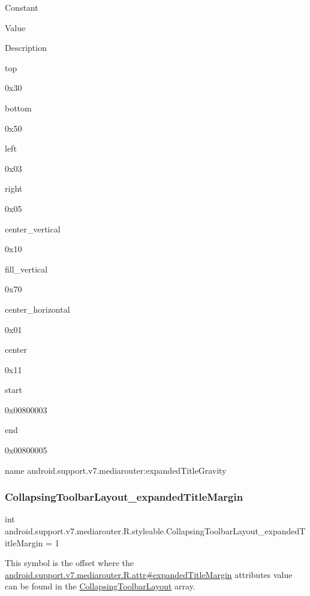 Constant

Value

Description 

{\ttfamily top}

0x30

{\ttfamily bottom}

0x50

{\ttfamily left}

0x03

{\ttfamily right}

0x05

{\ttfamily center\+\_\+vertical}

0x10

{\ttfamily fill\+\_\+vertical}

0x70

{\ttfamily center\+\_\+horizontal}

0x01

{\ttfamily center}

0x11

{\ttfamily start}

0x00800003

{\ttfamily end}

0x00800005

name android.\+support.\+v7.\+mediarouter\+:expanded\+Title\+Gravity \mbox{\label{classandroid_1_1support_1_1v7_1_1mediarouter_1_1R_1_1styleable_ac9af9dc4bdced732d343d68c26940f9e}} 
\subsubsection{\texorpdfstring{Collapsing\+Toolbar\+Layout\+\_\+expanded\+Title\+Margin}{CollapsingToolbarLayout\_expandedTitleMargin}}
{\footnotesize\ttfamily int android.\+support.\+v7.\+mediarouter.\+R.\+styleable.\+Collapsing\+Toolbar\+Layout\+\_\+expanded\+Title\+Margin = 1\hspace{0.3cm}{\ttfamily [static]}}

This symbol is the offset where the \hyperlink{classandroid_1_1support_1_1v7_1_1mediarouter_1_1R_1_1attr_a094d5abacdb04db8db3be458fef1e774}{android.\+support.\+v7.\+mediarouter.\+R.\+attr\#expanded\+Title\+Margin} attribute\textquotesingle{}s value can be found in the \hyperlink{classandroid_1_1support_1_1v7_1_1mediarouter_1_1R_1_1styleable_aae2cb4975e9b9a19d129888f497cc386}{Collapsing\+Toolbar\+Layout} array.

